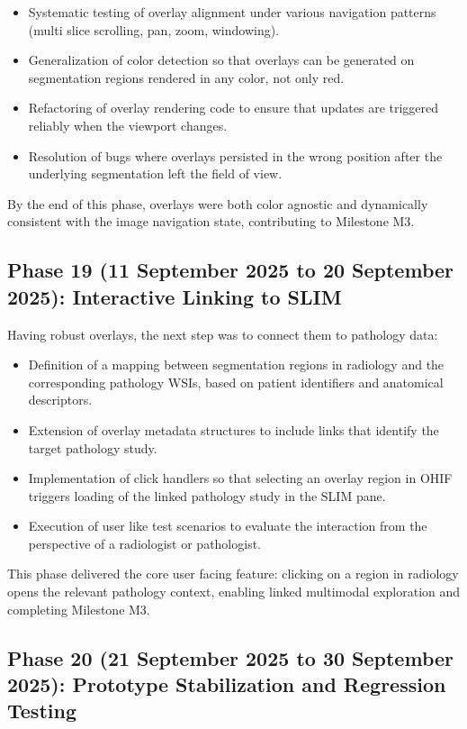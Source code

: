 \documentclass[11pt,a4paper]{article}
\begin{document}
\begin{itemize}
    \item Systematic testing of overlay alignment under various navigation patterns (multi slice scrolling, pan, zoom, windowing).
    \item Generalization of color detection so that overlays can be generated on segmentation regions rendered in any color, not only red.
    \item Refactoring of overlay rendering code to ensure that updates are triggered reliably when the viewport changes.
    \item Resolution of bugs where overlays persisted in the wrong position after the underlying segmentation left the field of view.
\end{itemize}

By the end of this phase, overlays were both color agnostic and dynamically consistent with the image navigation state, contributing to Milestone M3.

\subsection*{Phase 19 (11 September 2025 to 20 September 2025): Interactive Linking to SLIM}

Having robust overlays, the next step was to connect them to pathology data:

\begin{itemize}
    \item Definition of a mapping between segmentation regions in radiology and the corresponding pathology WSIs, based on patient identifiers and anatomical descriptors.
    \item Extension of overlay metadata structures to include links that identify the target pathology study.
    \item Implementation of click handlers so that selecting an overlay region in OHIF triggers loading of the linked pathology study in the SLIM pane.
    \item Execution of user like test scenarios to evaluate the interaction from the perspective of a radiologist or pathologist.
\end{itemize}

This phase delivered the core user facing feature: clicking on a region in radiology opens the relevant pathology context, enabling linked multimodal exploration and completing Milestone M3.

\subsection*{Phase 20 (21 September 2025 to 30 September 2025): Prototype Stabilization and Regression Testing}
\end{document}
